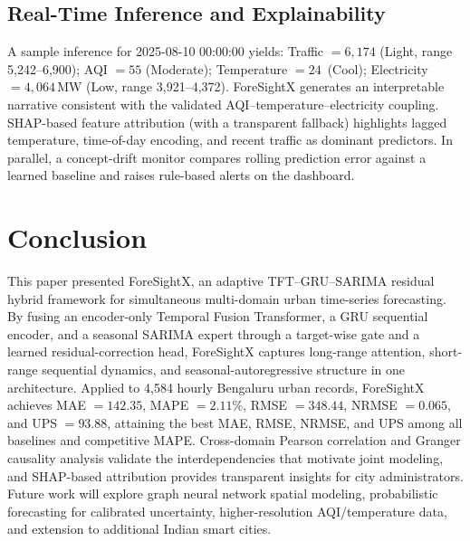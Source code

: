 \documentclass[conference]{IEEEtran}
\begin{document}
\subsection{Real-Time Inference and Explainability}
A sample inference for 2025-08-10 00:00:00 yields: Traffic $=6{,}174$ (Light, range 5{,}242--6{,}900); AQI $=55$ (Moderate); Temperature $=24$\,\textcelsius{} (Cool); Electricity $=4{,}064$\,MW (Low, range 3{,}921--4{,}372). ForeSightX generates an interpretable narrative consistent with the validated AQI--temperature--electricity coupling. SHAP-based feature attribution (with a transparent fallback) highlights lagged temperature, time-of-day encoding, and recent traffic as dominant predictors. In parallel, a concept-drift monitor compares rolling prediction error against a learned baseline and raises rule-based alerts on the dashboard.

\section{Conclusion}
This paper presented ForeSightX, an adaptive TFT--GRU--SARIMA residual hybrid framework for simultaneous multi-domain urban time-series forecasting. By fusing an encoder-only Temporal Fusion Transformer, a GRU sequential encoder, and a seasonal SARIMA expert through a target-wise gate and a learned residual-correction head, ForeSightX captures long-range attention, short-range sequential dynamics, and seasonal-autoregressive structure in one architecture. Applied to 4{,}584 hourly Bengaluru urban records, ForeSightX achieves MAE $=142.35$, MAPE $=2.11\%$, RMSE $=348.44$, NRMSE $=0.065$, and UPS $=93.88$, attaining the best MAE, RMSE, NRMSE, and UPS among all baselines and competitive MAPE. Cross-domain Pearson correlation and Granger causality analysis validate the interdependencies that motivate joint modeling, and SHAP-based attribution provides transparent insights for city administrators. Future work will explore graph neural network spatial modeling, probabilistic forecasting for calibrated uncertainty, higher-resolution AQI/temperature data, and extension to additional Indian smart cities.
\end{document}
